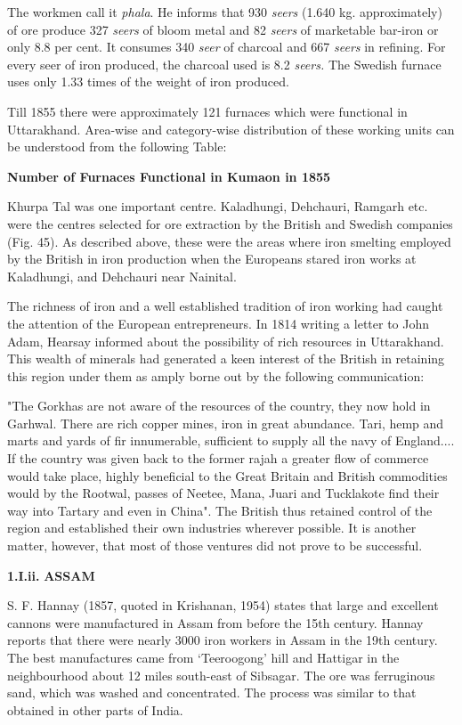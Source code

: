 The workmen call it \textit{phala}. He informs that 930 \textit{seers }(1.640 kg. approximately) of ore produce 327 \textit{seers }of bloom metal and 82 \textit{seers }of marketable bar-iron or only 8.8 per cent. It consumes 340 \textit{seer }of charcoal and 667 \textit{seers }in refining. For every seer of iron produced, the charcoal used is 8.2 \textit{seers. }The Swedish furnace uses only 1.33 times of the weight of iron produced.

Till 1855 there were approximately 121 furnaces which were functional in Uttarakhand. Area-wise and category-wise distribution of these working units can be understood from the following Table:

\textbf{Number of Furnaces Functional in Kumaon in 1855}

Khurpa Tal was one important centre. Kaladhungi, Dehchauri, Ramgarh etc. were the centres selected for ore extraction by the British and Swedish companies (Fig. 45). As described above, these were the areas where iron smelting employed by the British in iron production when the Europeans stared iron works at Kaladhungi, and Dehchauri near Nainital.

The richness of iron and a well established tradition of iron working had caught the attention of the European entrepreneurs. In 1814 writing a letter to John Adam, Hearsay informed about the possibility of rich resources in Uttarakhand. This wealth of minerals had generated a keen interest of the British in retaining this region under them as amply borne out by the following communication:

"The Gorkhas are not aware of the resources of the country, they now hold in Garhwal. There are rich copper mines, iron in great abundance. Tari, hemp and marts and yards of fir innumerable, sufficient to supply all the navy of England.... If the country was given back to the former rajah a greater flow of commerce would take place, highly beneficial to the Great Britain and British commodities would by the Rootwal, passes of Neetee, Mana, Juari and Tucklakote find their way into Tartary and even in China". The British thus retained control of the region and established their own industries wherever possible. It is another matter, however, that most of those ventures did not prove to be successful.

\textbf{1.I.ii.}\textbf{ ASSAM}

S. F. Hannay (1857, quoted in Krishanan, 1954) states that large and excellent cannons were manufactured in Assam from before the 15th century. Hannay reports that there were nearly 3000 iron workers in Assam in the 19th century. The best manufactures came from ‘Teeroogong’ hill and Hattigar in the neighbourhood about 12 miles south-east of Sibsagar. The ore was ferruginous sand, which was washed and concentrated. The process was similar to that obtained in other parts of India.

